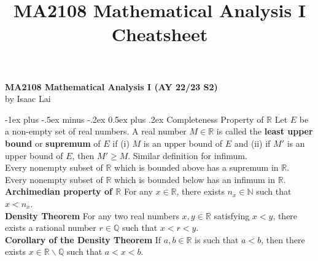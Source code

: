 \documentclass[10pt,landscape]{article}
\title{MA2108 Mathematical Analysis I Cheatsheet}
\makeatletter
\renewcommand{\section}{\@startsection{section}{1}{0mm}%
                                {-1ex plus -.5ex minus -.2ex}%
                                {0.5ex plus .2ex}%
                                {\normalfont\large\bfseries}}
\makeatother
\begin{document}
\raggedright
\footnotesize

\begin{center}
     \Large{\textbf{MA2108 Mathematical Analysis I (AY 22/23 S2)}} \\
	 \small{by Isaac Lai}
\end{center}
\begin{multicols}{3}
\setlength{\premulticols}{1pt}
\setlength{\postmulticols}{1pt}
\setlength{\multicolsep}{1pt}
\setlength{\columnsep}{2pt}

\section{Completeness Property of $\mathbb{R}$}
Let $E$ be a non-empty set of real numbers. A real number  $M\in\mathbb{R}$ is called the \textbf{least upper bound} or \textbf{supremum} of  $E$ if (i)  $M$ is an upper bound of  $E$ and (ii) if  $M'$ is an upper bound of  $E$, then  $M'\geq M$. Similar definition for infimum.\\
Every nonempty subset of $\mathbb{R}$ which is bounded above has a supremum in  $\mathbb{R}$.\\
Every nonempty subset of  $\mathbb{R}$ which is bounded below has an infimum in  $\mathbb{R}$.\\
\textbf{Archimedian property of $\mathbb{R}$} For any $x\in\mathbb{R}$, there exists  $n_x\in\mathbb{N}$ such that  $x<n_x$.\\
\textbf{Density Theorem} For any two real numbers $x,y\in\mathbb{R}$ satisfying  $x<y$, there exists a rational number  $r\in\mathbb{Q}$ such that  $x<r<y$.\\
\textbf{Corollary of the Density Theorem} If  $a,b\in\mathbb{R}$ is such that  $a<b$, then there exists  $x\in\mathbb{R}\backslash\mathbb{Q}$ such that  $a<x<b$.


\end{multicols}
\end{document}
